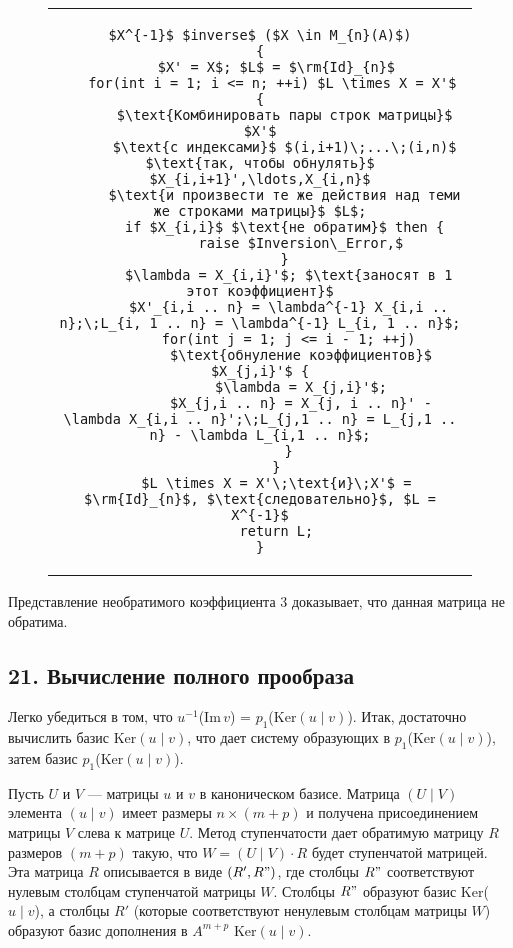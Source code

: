 {\begin{figure}[htp]
\centering
\begin{tabular}{c}
\begin{lstlisting}[mathescape=true, captionpos={bo}, caption={Обращение матрицы в кольце главных идеалов}]
$X^{-1}$ $inverse$ ($X \in M_{n}(A)$)
{
	$X' = X$; $L$ = $\rm{Id}_{n}$
   for(int i = 1; i <= n; ++i) $L \times X = X'$ {
      $\text{Комбинировать пары строк матрицы}$ $X'$
      $\text{с индексами}$ $(i,i+1)\;...\;(i,n)$ $\text{так, чтобы обнулять}$ $X_{i,i+1}',\ldots,X_{i,n}$
      $\text{и произвести те же действия над теми же строками матрицы}$ $L$;
      if $X_{i,i}$ $\text{не обратим}$ then {
          raise $Inversion\_Error,$
      }
	   $\lambda = X_{i,i}'$; $\text{заносят в 1 этот коэффициент}$
	   $X'_{i,i .. n} = \lambda^{-1} X_{i,i .. n};\;L_{i, 1 .. n} = \lambda^{-1} L_{i, 1 .. n}$;
	   for(int j = 1; j <= i - 1; ++j)
          $\text{обнуление коэффициентов}$ $X_{j,i}'$ {
	      $\lambda = X_{j,i}'$;
	      $X_{j,i .. n} = X_{j, i .. n}' - \lambda X_{i,i .. n}';\;L_{j,1 .. n} = L_{j,1 .. n} - \lambda L_{i,1 .. n}$;
	   }
    }
    $L \times X = X'\;\text{и}\;X'$ = $\rm{Id}_{n}$, $\text{следовательно}$, $L = X^{-1}$
    return L;
}
\end{lstlisting}
\end{tabular}
\end{figure}

\noindent Представление необратимого коэффициента 3 доказывает, что данная
матрица не обратима.

\subsection{\normalsize{21. Вычисление полного прообраза}}

Легко убедиться в том, что $u^{-1}$(Im\,$v$) = $p_{1}$(Ker$(u \;|\; v)$). Итак, достаточно вычислить базис Ker$(u \;|\; v)$, что дает систему образующих в
$p_{1}$(Ker$(u \;|\; v)$), затем базис $p_{1}$(Ker$(u \;|\; v)$).

Пусть $U$ и $V$ --- матрицы $u$ и $v$ в каноническом базисе. Матрица
$(U \;|\; V)$ элемента $(u \;|\; v)$ имеет размеры $n \times (m+p)$ и получена присоединением матрицы $V$ слева к матрице $U$. Метод ступенчатости дает обратимую матрицу $R$ размеров $(m+p)$ такую, что $W = (U \;|\; V) \cdot R$ будет ступенчатой матрицей. Эта матрица $R$ описывается в виде $(R',R")$,
где столбцы $R"$ соответствуют нулевым столбцам ступенчатой матрицы $W$. Столбцы $R"$ образуют базис Ker($u \;|\; v$), а столбцы $R'$ (которые
соответствуют ненулевым столбцам матрицы $W$) образуют базис дополнения в $A^{m+p}$ Ker{$(u \;|\; v)$}.

}
